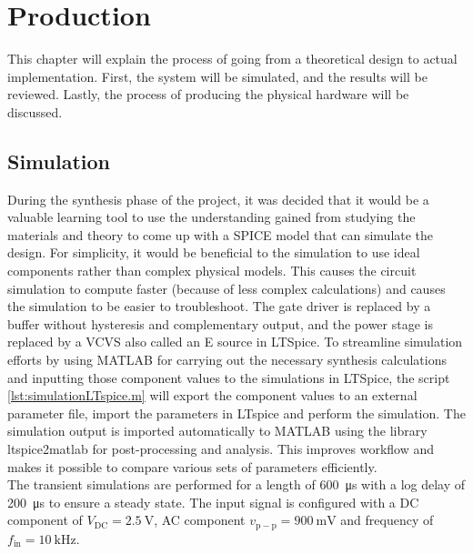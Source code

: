 \chapter[Production]{Production}
This chapter will explain the process of going from a theoretical design to actual implementation. First, the system will be simulated, and the results will be reviewed. Lastly, the process of producing the physical hardware will be discussed.
\section{Simulation}
During the synthesis phase of the project, it was decided that it would be a valuable learning tool to use the understanding gained from studying the materials and theory to come up with a SPICE model that can simulate the design. For simplicity, it would be beneficial to the simulation to use ideal components rather than complex physical models. This causes the circuit simulation to compute faster (because of less complex calculations) and causes the simulation to be easier to troubleshoot. The gate driver is replaced by a buffer without hysteresis and complementary output, and the power stage is replaced by a VCVS also called an E source in LTSpice. To streamline simulation efforts by using MATLAB for carrying out the necessary synthesis calculations and inputting those component values to the simulations in LTSpice, the script \autoref{lst:simulationLTspice.m} will export the component values to an external parameter file, import the parameters in LTspice and perform the simulation. The simulation output is imported automatically to MATLAB using the library ltspice2matlab \cite{ltspice2matlab} for post-processing and analysis. This improves workflow and makes it possible to compare various sets of parameters efficiently. \\
The transient simulations are performed for a length of \SI{600}{\micro\second} with a log delay of \SI{200}{\micro\second} to ensure a steady state. The input signal is configured with a DC component of $V_{\mathrm{DC}} = \SI{2.5}{\volt}$, AC component $v_{\mathrm{p-p}} = \SI{900}{\milli\volt}$ and frequency of $f_{\mathrm{in}} = \SI{10}{\kilo\hertz}$.

